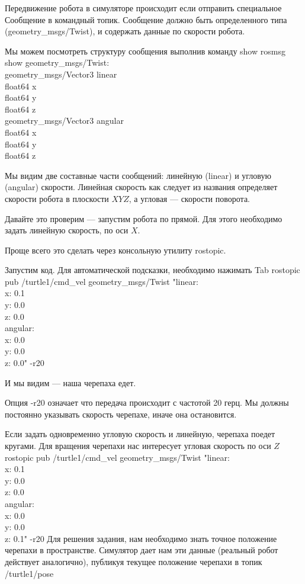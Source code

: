 Передвижение робота в симуляторе происходит если отправить специальное Сообщение в командный топик. Сообщение должно быть определенного типа (geometry\_msgs/Twist), и содержать данные по скорости робота.

Мы можем посмотреть структуру сообщения выполнив команду show rosmsg show geometry\_msgs/Twist:\\
geometry\_msgs/Vector3 linear\\
	float64 x\\  
	float64 y\\  
	float64 z\\
geometry\_msgs/Vector3 angular\\
  float64 x\\
  float64 y\\
  float64 z

Мы видим две составные части сообщений: линейную (linear) и угловую (angular) скорости. Линейная скорость как следует из названия определяет скорости робота в плоскости $XYZ$, а угловая — скорости поворота.

Давайте это проверим — запустим робота по прямой. Для этого необходимо задать линейную скорость, по оси $X$.

Проще всего это сделать через консольную утилиту rostopic.

Запустим код. Для автоматической подсказки, необходимо нажимать Tab
rostopic pub /turtle1/cmd\_vel geometry\_msgs/Twist "linear:\\
  x: 0.1\\
  y: 0.0\\
  z: 0.0\\
angular:\\
  x: 0.0\\
  y: 0.0\\
  z: 0.0" -r20

И мы видим — наша черепаха едет.

Опция -r20 означает что передача происходит с частотой 20 герц. Мы должны постоянно указывать скорость черепахе, иначе она остановится.

Если задать одновременно угловую скорость и линейную, черепаха поедет кругами. Для вращения черепахи нас интересует угловая скорость по оси $Z$
rostopic pub /turtle1/cmd\_vel geometry\_msgs/Twist "linear:\\
  x: 0.1\\
  y: 0.0\\
  z: 0.0\\
angular:\\
  x: 0.0\\
  y: 0.0\\
  z: 0.1" -r20
Для решения задания, нам необходимо знать точное положение черепахи в пространстве. Симулятор дает нам эти данные (реальный робот действует аналогично), публикуя текущее положение черепахи в топик /turtle1/pose

